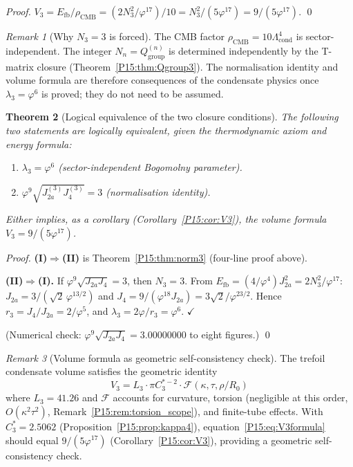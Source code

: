 \documentclass[11pt,a4paper]{article}
\newtheorem{theorem}{Theorem}[section]
\theoremstyle{definition}\newtheorem{definition}[theorem]{Definition}
\theoremstyle{remark}
\newtheorem{remark}[theorem]{Remark}
\newcommand{\vp}{\varphi}
\newcommand{\lam}{\lambda}
\newcommand{\Ja}{J_{2a}}
\newcommand{\Jfour}{J_4}
\newcommand{\Lcond}{\Lambda_{\mathrm{cond}}}
\newcommand{\rCMB}{\rho_{\mathrm{CMB}}}
\newcommand{\Efb}{E_{\mathrm{fb}}}
\begin{document}
\begin{proof}
$V_3=\Efb/\rCMB=(2N_3^2/\vp^{17})/10=N_3^2/(5\vp^{17})=9/(5\vp^{17})$.
\qed
\end{proof}

\begin{remark}[Why $N_3=3$ is forced]
\label{P15:rem:why_N3_forced}
The CMB factor $\rCMB=10\Lcond^4$ is sector-independent.
The integer $N_n=Q_{\mathrm{group}}^{(n)}$ is determined independently
by the T-matrix closure (Theorem~\ref{P15:thm:Qgroup3}).
The normalisation identity and volume formula are therefore
consequences of the condensate physics once $\lam_3=\vp^6$ is proved;
they do not need to be assumed.
\end{remark}

\begin{theorem}[Logical equivalence of the two closure conditions]
\label{P15:thm:equivalence}
The following two statements are logically equivalent,
given the thermodynamic axiom and energy formula:
\begin{enumerate}[noitemsep,label=(\Roman*)]
\item $\lam_3 = \vp^6$ (sector-independent Bogomolny parameter).
\item $\vp^9\sqrt{\Ja^{(3)}\Jfour^{(3)}} = 3$ (normalisation identity).
\end{enumerate}
Either implies, as a corollary (Corollary~\ref{P15:cor:V3}),
the volume formula $V_3=9/(5\vp^{17})$.
\end{theorem}

\begin{proof}
\textbf{(I)$\Rightarrow$(II)} is Theorem~\ref{P15:thm:norm3} (four-line proof above).

\textbf{(II)$\Rightarrow$(I).}
If $\vp^9\sqrt{\Ja\Jfour}=3$, then $N_3=3$.
From $\Efb=(4/\vp^4)\Ja^2=2N_3^2/\vp^{17}$:
$\Ja=3/(\sqrt{2}\,\vp^{13/2})$ and $\Jfour=9/(\vp^{18}\Ja)=3\sqrt{2}/\vp^{23/2}$.
Hence $r_3=\Jfour/\Ja=2/\vp^5$, and
$\lam_3=2\vp/r_3=\vp^6$. $\checkmark$

\smallskip\noindent
(Numerical check: $\vp^9\sqrt{\Ja\Jfour}=3.00000000$ to eight figures.)
\qed
\end{proof}

\begin{remark}[Volume formula as geometric self-consistency check]
The trefoil condensate volume satisfies the geometric identity
\begin{equation}
  V_3 = L_3\cdot\pi C_3^{*-2}\cdot\mathcal{F}(\kappa,\tau,\rho/R_0)
  \label{P15:eq:V3formula}
\end{equation}
where $L_3=41.26$ and $\mathcal{F}$ accounts for curvature,
torsion (negligible at this order, $O(\kappa^2\tau^2)$,
Remark~\ref{P15:rem:torsion_scope}), and finite-tube effects.
With $C_3^*=2.5062$ (Proposition~\ref{P15:prop:kappa4}),
equation~\eqref{P15:eq:V3formula} should equal $9/(5\vp^{17})$
(Corollary~\ref{P15:cor:V3}), providing a geometric self-consistency check.
\end{remark}
\end{document}
